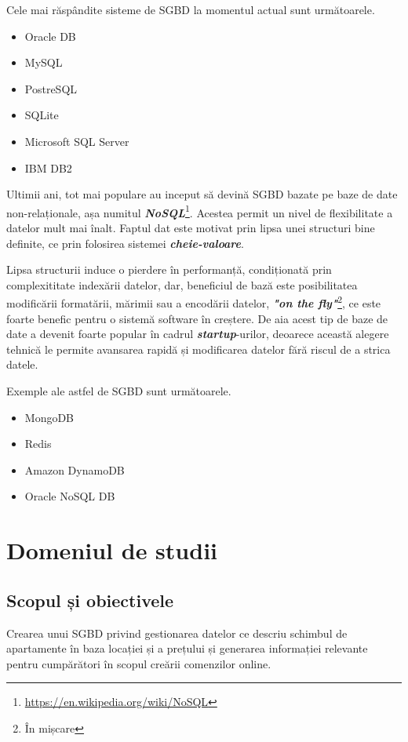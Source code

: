 \documentclass[12pt. a4paper]{report}
\begin{document}
Cele mai răspândite sisteme de SGBD la momentul actual sunt următoarele.
\begin{itemize}
	\item Oracle DB
	\item MySQL
	\item PostreSQL
	\item SQLite
	\item Microsoft SQL Server
	\item IBM DB2
\end{itemize}

Ultimii ani, tot mai populare au inceput să devină SGBD bazate pe baze de date non-relaționale, așa numitul \emph{\textbf{NoSQL}}\footnote{\url{https://en.wikipedia.org/wiki/NoSQL}}. Acestea permit un nivel de flexibilitate a datelor mult mai înalt. Faptul dat este motivat prin lipsa unei structuri bine definite, ce prin folosirea sistemei \emph{\textbf{cheie-valoare}}.

Lipsa structurii induce o pierdere în performanță, condiționată prin complexititate indexării datelor, dar, beneficiul de bază este posibilitatea modificării formatării, mărimii sau a encodării datelor, \emph{\textbf{"on the fly"}}\footnote{În mișcare}, ce este foarte benefic pentru o sistemă software în creștere. De aia acest tip de baze de date a devenit foarte popular în cadrul \emph{\textbf{startup}}-urilor, deoarece această alegere tehnică le permite avansarea rapidă și modificarea datelor fără riscul de a strica datele.

Exemple ale astfel de SGBD sunt următoarele.
\begin{itemize}
	\item MongoDB
	\item Redis
	\item Amazon DynamoDB
	\item Oracle NoSQL DB
\end{itemize}

\chapter{Domeniul de studii}

\section{Scopul și obiectivele}
Crearea unui SGBD privind gestionarea datelor ce descriu schimbul de apartamente în baza locației și a prețului și generarea informației relevante pentru cumpărători în scopul creării comenzilor online.
\end{document}
